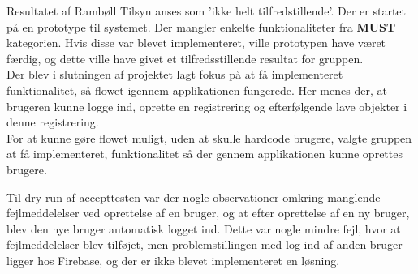 \clearpage

Resultatet af Rambøll Tilsyn anses som 'ikke helt tilfredstillende'. 
Der er startet på en prototype til systemet. Der mangler enkelte funktionaliteter fra \textbf{MUST} kategorien. Hvis disse var blevet implementeret, ville prototypen have været færdig, og dette ville have givet et tilfredsstillende resultat for gruppen. \\
Der blev i slutningen af projektet lagt fokus på at få implementeret funktionalitet, så flowet igennem applikationen fungerede. Her menes der, at brugeren kunne logge ind, oprette en registrering og efterfølgende lave objekter i denne registrering. \\
For at kunne gøre flowet muligt, uden at skulle hardcode brugere, valgte gruppen at få implementeret, funktionalitet så der gennem applikationen kunne oprettes brugere. 

Til dry run af accepttesten var der nogle observationer omkring manglende fejlmeddelelser ved oprettelse af en bruger, og at efter oprettelse af en ny bruger, blev den nye bruger automatisk logget ind. Dette var nogle mindre fejl, hvor at fejlmeddelelser blev tilføjet, men problemstillingen med log ind af anden bruger ligger hos Firebase, og der er ikke blevet implementeret en løsning.